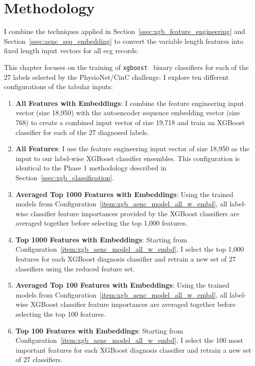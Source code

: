 \documentclass[\main/thesis.tex]{subfiles}
\begin{document}
\section{Methodology}

I combine the techniques applied in Section~\ref{ssec:xgb_feature_engineering} and Section~\ref{ssec:aenc_seq_embedding} to convert the variable length features into fixed length input vectors for all \gls{ecg} records.

This chapter focuses on the training of \texttt{xgboost}~\cite{chen_xgboost_2016} binary classifiers for each of the 27 labels selected by the PhysioNet/CinC challenge.
I explore ten different configurations of the tabular inputs:
\begin{enumerate}
    \item \label{item:xgb_aenc_model_all_w_embd} \textbf{All Features with Embeddings}: I combine the feature engineering input vector (size 18,950) with the autoencoder sequence embedding vector (size 768) to create a combined input vector of size 19,718 and train an XGBoost classifier for each of the 27 diagnosed labels.
    \item \label{item:xgb_aenc_model_all_no_embd} \textbf{All Features}: I use the feature engineering input vector of size 18,950 as the input to our label-wise XGBoost classifier ensembles. This configuration is identical to the Phase 1 methodology described in Section~\ref{ssec:xgb_classification}.
    \item \label{item:xgb_aenc_model_avgd_top_1000_w_embd} \textbf{Averaged Top 1000 Features with Embeddings}: Using the trained models from Configuration~\ref{item:xgb_aenc_model_all_w_embd}, all label-wise classifier feature importances provided by the XGBoost classifiers are averaged together before selecting the top 1,000 features.
    \item \label{item:xgb_aenc_model_top_1000_w_embd} \textbf{Top 1000 Features with Embeddings}: Starting from Configuration~\ref{item:xgb_aenc_model_all_w_embd}, I select the top 1,000 features for each XGBoost diagnosis classifier and retrain a new set of 27 classifiers using the reduced feature set.
    \item \label{item:xgb_aenc_model_avgd_top_100_w_embd} \textbf{Averaged Top 100 Features with Embeddings}: Using the trained models from Configuration~\ref{item:xgb_aenc_model_all_w_embd}, all label-wise XGBoost classifier feature importances are averaged together before selecting the top 100 features.
    \item \label{item:xgb_aenc_model_top_100_w_embd} \textbf{Top 100 Features with Embeddings}: Starting from Configuration~\ref{item:xgb_aenc_model_all_w_embd}, I select the 100 most important features for each XGBoost diagnosis classifier and retrain a new set of 27 classifiers.

\end{enumerate}
\end{document}
